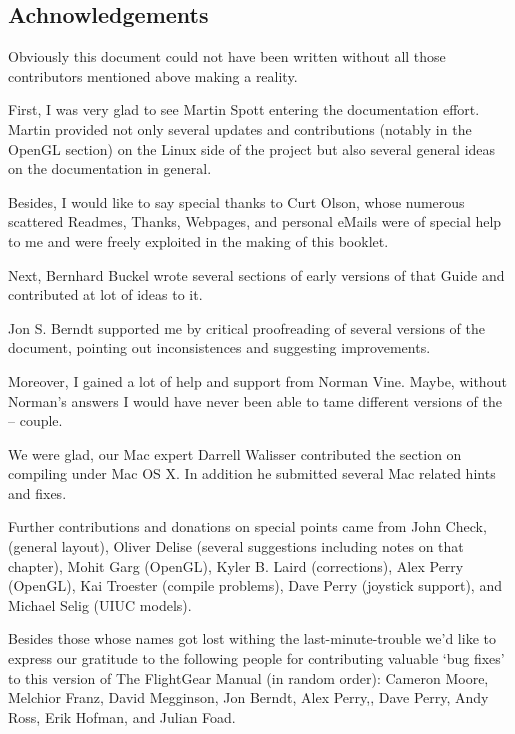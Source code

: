 \subsection*{Achnowledgements}
Obviously this document could not have been written without all those contributors
mentioned above making \FlightGear{} a reality.

First, I was very glad to see Martin Spott  entering
the documentation effort. Martin provided not only several updates and
contributions (notably in the OpenGL section) on the Linux side of the
project but also several general ideas on the documentation in general.

Besides, I would like to say special thanks to Curt Olson, whose
numerous scattered Readmes, Thanks, Webpages, and personal eMails were of special help to
me and were freely exploited in the making of this booklet.

Next, Bernhard Buckel  wrote several sections of early versions
of that Guide and contributed at lot of ideas to it.

Jon S. Berndt  supported me by critical proofreading of several
versions of the document, pointing out inconsistences and suggesting improvements.

Moreover, I gained a lot of help and support from Norman Vine. Maybe,
without Norman's answers I would have never been able to tame different versions of the
\Cygwin{} -- \FlightGear{} couple.

We were glad, our Mac expert Darrell Walisser  contributed the section on compiling under Mac OS X. In addition he submitted several Mac related hints and fixes.

Further contributions and donations on special points came from John Check, (general layout), Oliver Delise  (several suggestions
including notes on that chapter), Mohit Garg  (OpenGL), Kyler B. Laird
 (corrections), Alex Perry (OpenGL), Kai
Troester (compile problems), Dave Perry  (joystick support), and Michael Selig (UIUC models).

Besides those whose names got lost withing the last-minute-trouble we'd
like to express our gratitude to the following people for contributing
valuable `bug fixes' to this version of The FlightGear Manual (in
random order): Cameron Moore, Melchior
Franz, David Megginson,
Jon Berndt, Alex Perry,, Dave
Perry, Andy Ross, Erik
Hofman, and Julian Foad.

